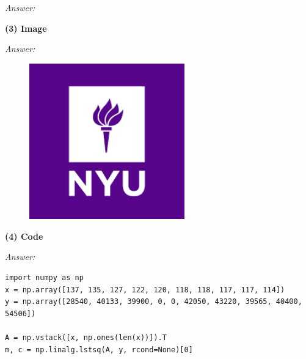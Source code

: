 \documentclass{article}
\newcommand{\newsectiontwo}[1]{
    \textbf{#1}
    \vspace{0.5em}
}
\newenvironment{answer}{
	\noindent
	\textit{Answer:}
	
}{\vspace{1em}}
\begin{document}
\begin{CJK}{UTF8}{gbsn}
\begin{answer}
\end{answer}





\newsectiontwo{(3) Image}

\begin{answer}

\begin{figure}[!ht]
\begin{center}
  \includegraphics[width = 0.6\textwidth]{img/NYU.png}	
\end{center}
\end{figure}

\end{answer}



\newsectiontwo{(4) Code}

\begin{answer}

\begin{lstlisting}[title=Python code, frame=shadowbox]
import numpy as np
x = np.array([137, 135, 127, 122, 120, 118, 118, 117, 117, 114])            
y = np.array([28540, 40133, 39900, 0, 0, 42050, 43220, 39565, 40400, 54506])

A = np.vstack([x, np.ones(len(x))]).T                                       
m, c = np.linalg.lstsq(A, y, rcond=None)[0]  
                               
\end{lstlisting}

\end{answer}


\newpage

\end{CJK}
\end{document}
